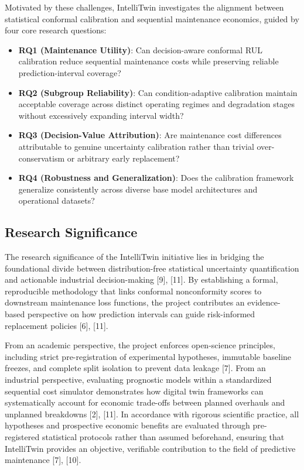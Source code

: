 \documentclass[12pt,a4paper]{article}
\begin{document}
Motivated by these challenges, IntelliTwin investigates the alignment between statistical conformal calibration and sequential maintenance economics, guided by four core research questions:
\begin{itemize}
    \item \textbf{RQ1 (Maintenance Utility)}: Can decision-aware conformal RUL calibration reduce sequential maintenance costs while preserving reliable prediction-interval coverage?
    \item \textbf{RQ2 (Subgroup Reliability)}: Can condition-adaptive calibration maintain acceptable coverage across distinct operating regimes and degradation stages without excessively expanding interval width?
    \item \textbf{RQ3 (Decision-Value Attribution)}: Are maintenance cost differences attributable to genuine uncertainty calibration rather than trivial over-conservatism or arbitrary early replacement?
    \item \textbf{RQ4 (Robustness and Generalization)}: Does the calibration framework generalize consistently across diverse base model architectures and operational datasets?
\end{itemize}

\subsection{Research Significance}
The research significance of the IntelliTwin initiative lies in bridging the foundational divide between distribution-free statistical uncertainty quantification and actionable industrial decision-making [9], [11]. By establishing a formal, reproducible methodology that links conformal nonconformity scores to downstream maintenance loss functions, the project contributes an evidence-based perspective on how prediction intervals can guide risk-informed replacement policies [6], [11].

From an academic perspective, the project enforces open-science principles, including strict pre-registration of experimental hypotheses, immutable baseline freezes, and complete split isolation to prevent data leakage [7]. From an industrial perspective, evaluating prognostic models within a standardized sequential cost simulator demonstrates how digital twin frameworks can systematically account for economic trade-offs between planned overhauls and unplanned breakdowns [2], [11]. In accordance with rigorous scientific practice, all hypotheses and prospective economic benefits are evaluated through pre-registered statistical protocols rather than assumed beforehand, ensuring that IntelliTwin provides an objective, verifiable contribution to the field of predictive maintenance [7], [10].
\end{document}
